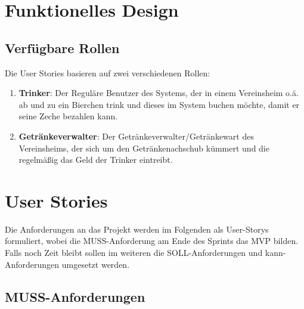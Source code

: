 \documentclass[conference,a4paper]{cs-techrep}
\begin{document}
\section{Funktionelles Design}
\subsection{Verfügbare Rollen}
Die User Stories basieren auf zwei verschiedenen Rollen:
\begin{enumerate}
\item \textbf{Trinker}: 
Der Reguläre Benutzer des Systems, der in einem Vereinsheim o.ä. ab und zu ein Bierchen trink und dieses im System buchen möchte, damit er seine Zeche bezahlen kann.
\item \textbf{Getränkeverwalter}: 
Der Getränkeverwalter/Getränkewart des Vereinsheims, der sich um den Getränkenachschub kümmert und die regelmäßig das Geld der Trinker eintreibt.
\end{enumerate}

\section{User Stories}

Die Anforderungen an das Projekt werden im Folgenden als User-Storys formuliert, wobei die MUSS-Anforderung am Ende des Sprints das MVP bilden. Falls noch Zeit bleibt sollen im weiteren die SOLL-Anforderungen und kann-Anforderungen umgesetzt werden.

\subsection{MUSS-Anforderungen}
\end{document}

